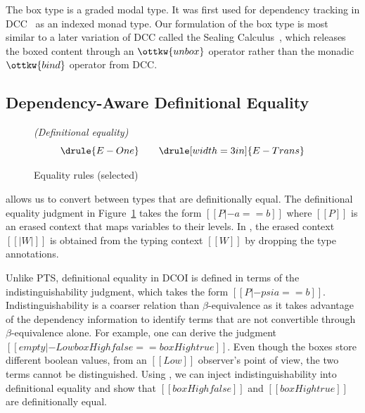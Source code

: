 \documentclass[acmsmall]{acmart}
\newcommand{\name}{DCOI\xspace}
\begin{document}
The box type is a graded modal type. It was first used for dependency
tracking in DCC~\citep{abadi1999core} as an indexed monad type. Our
formulation of the box type is most similar to a later variation of
DCC called the Sealing
Calculus~\citep{shikuma2008proving}, which releases the boxed content
through an $\ottkw{unbox}$ operator rather than the monadic
$\ottkw{bind}$ operator from DCC.

\subsection{Dependency-Aware Definitional Equality}\label{sec:defeq}

\begin{figure}[h]
\begin{minipage}{0.9\textwidth}
\fbox{$[[P |- a == b]]$} \hfill \emph{(Definitional equality)}\\
\[ \drule{E-One} \qquad \drule[width=3in]{E-Trans} \]

\end{minipage}
\caption{Equality rules (selected)}
\label{fig:defeq}
\end{figure}

 allows us to convert between types that are
definitionally equal. 
The definitional equality judgment in Figure~\ref{fig:defeq} takes the form $[[P |- a == b]]$
where $[[P]]$ is an erased context that maps variables to their
levels. In , the erased context $[[|W|]]$ is obtained
from the typing context $[[W]]$ by dropping the type annotations.

Unlike PTS, definitional equality in \name{} is defined in terms of the
indistinguishability judgment, which takes the form $[[P |- psi a == b]]$.
Indistinguishability is a coarser relation than $\beta$-equivalence as it
takes advantage of the dependency information to identify terms that
are not convertible through $\beta$-equivalence alone. For example, one
can derive the judgment $[[empty |- Low box High false == box High
true]]$. Even though the boxes store different boolean values, from an $[[Low]]$
observer's point of view, the two terms cannot be distinguished. Using
, we can inject indistinguishability into definitional
equality and show that $[[box High false]]$ and $[[box High true]]$ are
definitionally equal. 
\end{document}
